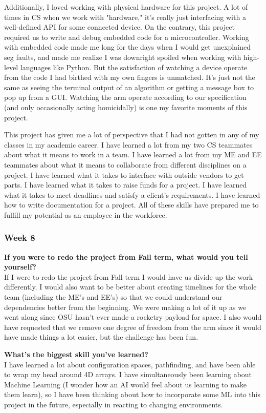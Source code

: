 Additionally, I loved working with physical hardware for this project. A lot of times in CS when we work with "hardware," it's really just interfacing with a well-defined API for some connected device. On the contrary, this project required us to write and debug embedded code for a microcontroller. Working with embedded code made me long for the days when I would get unexplained seg faults, and made me realize I was downright spoiled when working with high-level languages like Python. But the satisfaction of watching a device operate from the code I had birthed with my own fingers is unmatched. It's just not the same as seeing the terminal output of an algorithm or getting a message box to pop up from a GUI. Watching the arm operate according to our specification (and only occasionally acting homicidally) is one my favorite moments of this project.

This project has given me a lot of perspective that I had not gotten in any of my classes in my academic career. I have learned a lot from my two CS teammates about what it means to work in a team. I have learned a lot from my ME and EE teammates about what it means to collaborate from different disciplines on a project. I have learned what it takes to interface with outside vendors to get parts. I have learned what it takes to raise funds for a project. I have learned what it takes to meet deadlines and satisfy a client's requirements. I have learned how to write documentation for a project. All of these skills have prepared me to fulfill my potential as an employee in the workforce.

\subsubsection{Week 8}
\textbf{If you were to redo the project from Fall term, what would you tell yourself?} \\ 
If I were to redo the project from Fall term I would have us divide up the work differently. I would also want to be better about creating timelines for the whole team (including the ME's and EE's) so that we could understand our dependencies better from the beginning. We were making a lot of it up as we went along since OSU hasn't ever made a rocketry payload for space. I also would have requested that we remove one degree of freedom from the arm since it would have made things a lot easier, but the challenge has been fun.

\textbf{What's the biggest skill you've learned?} \\ 
I have learned a lot about configuration spaces, pathfinding, and have been able to wrap my head around 4D arrays. I have simultaneously been learning about Machine Learning (I wonder how an AI would feel about us learning to make them learn), so I have been thinking about how to incorporate some ML into this project in the future, especially in reacting to changing environments.

